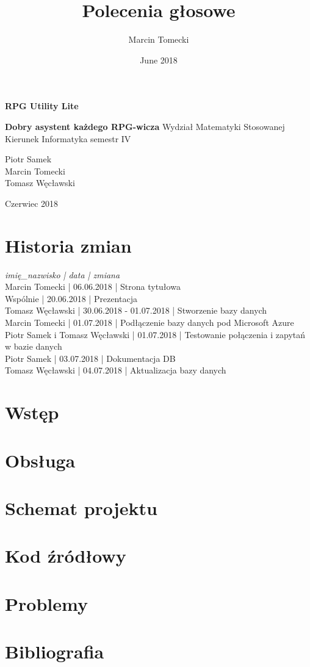 \documentclass{article}
\title{Polecenia głosowe}
\author{Marcin Tomecki}
\date{June 2018}
\begin{document}
\begin{titlepage}
\centering
\Huge \textbf{RPG Utility Lite}\par
\Large \textbf{Dobry asystent każdego RPG-wicza}
\vfill
Wydział Matematyki Stosowanej\\Kierunek Informatyka semestr IV\par
\vfill
\vfill
\begin{flushright}
Piotr Samek\\
Marcin Tomecki\\
Tomasz Węcławski
\end{flushright}
Czerwiec 2018
\end{titlepage}
\tableofcontents
\newpage
\clearpage
\section{Historia zmian}
\textit{imię\_nazwisko | data | zmiana}\\
Marcin Tomecki                 | 06.06.2018              | Strona tytułowa\\
Wspólnie                       | 20.06.2018              | Prezentacja\\
Tomasz Węcławski               | 30.06.2018 - 01.07.2018 | Stworzenie bazy danych\\
Marcin Tomecki                 | 01.07.2018              | Podłączenie bazy danych pod Microsoft Azure\\
Piotr Samek i Tomasz Węcławski | 01.07.2018              | Testowanie połączenia i zapytań w bazie danych\\
Piotr Samek                    | 03.07.2018              | Dokumentacja DB\\
Tomasz Węcławski               | 04.07.2018              | Aktualizacja bazy danych

\section{Wstęp}

\section{Obsługa}

\section{Schemat projektu}

\section{Kod źródłowy}

\section{Problemy}

\section{Bibliografia}
\end{document}
